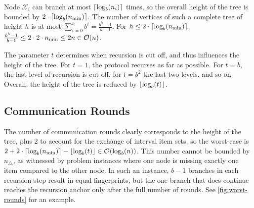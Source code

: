 Node $\mathcal{X}_i$ can branch at most $\lceil\log_{b}(n_i)\rceil$ times, so the overall height of the tree is bounded by $2 \cdot\lceil\log_{b}(n_{\min})\rceil$. The number of vertices of such a complete tree of height $h$ is at most $\sum_{i=0}^{h} b^{i} = \frac{b^{h} - 1}{b - 1}$. For $h \leq 2 \cdot\lceil\log_{b}(n_{\min})\rceil$, $\frac{b^{h} - 1}{b - 1} \leq 2 \cdot 2 \cdot n_{\min} \leq 2n \in \mathcal{O}(n)$.

The parameter $t$ determines when recursion is cut off, and thus influences the height of the tree. For $t = 1$, the protocol recurses as far as possible. For $t = b$, the last level of recursion is cut off, for $t = b^2$ the last two levels, and so on. Overall, the height of the tree is reduced by $\lfloor\log_{b}(t)\rfloor$.

\subsection{Communication Rounds}

The number of communication rounds clearly corresponds to the height of the tree, plus $2$ to account for the exchange of interval item sets, so the worst-case is $2 + 2 \cdot\lceil\log_{b}(n_{\min})\rceil - \lfloor\log_{b}(t)\rfloor \in \mathcal{O}(\log_{b}(n))$. This number cannot be bounded by $n_{\triangle}$, as witnessed by problem instances where one node is missing exactly one item compared to the other node. In such an instance, $b - 1$ branches in each recursion step result in equal fingerprints, but the one branch that does continue reaches the recursion anchor only after the full number of rounds. See \cref{fig:worst-rounds} for an example.

